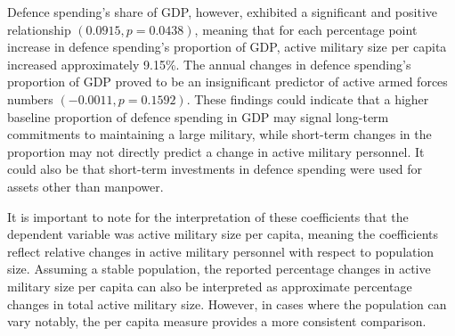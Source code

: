 Defence spending's share of GDP, however, exhibited a significant and positive relationship $(0.0915, p=0.0438)$, meaning that for each percentage point increase in defence spending's proportion of GDP, active military size per capita increased approximately 9.15\%.
The annual changes in defence spending's proportion of GDP proved to be an insignificant predictor of active armed forces numbers $(-0.0011, p=0.1592)$. 
These findings could indicate that a higher baseline proportion of defence spending in GDP may signal long-term commitments to maintaining a large military, while short-term changes in the proportion may not directly predict a change in active military personnel. 
It could also be that short-term investments in defence spending were used for assets other than manpower.

It is important to note for the interpretation of these coefficients that the dependent variable was active military size per capita, meaning the coefficients reflect relative changes in active military personnel with respect to population size. 
Assuming a stable population, the reported percentage changes in active military size per capita can also be interpreted as approximate percentage changes in total active military size. 
However, in cases where the population can vary notably, the per capita measure provides a more consistent comparison.